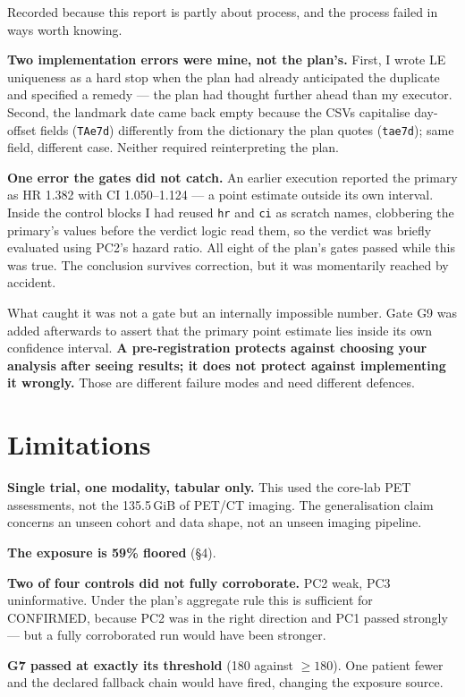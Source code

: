 \documentclass[11pt,a4paper]{article}
\begin{document}
Recorded because this report is partly about process, and the process failed in ways worth
knowing.

\textbf{Two implementation errors were mine, not the plan's.} First, I wrote LE uniqueness as a
hard stop when the plan had already anticipated the duplicate and specified a remedy --- the plan
had thought further ahead than my executor. Second, the landmark date came back empty because the
CSVs capitalise day-offset fields (\texttt{TAe7d}) differently from the dictionary the plan quotes
(\texttt{tae7d}); same field, different case. Neither required reinterpreting the plan.

\textbf{One error the gates did not catch.} An earlier execution reported the primary as
HR 1.382 with CI 1.050--1.124 --- a point estimate outside its own interval. Inside the control
blocks I had reused \texttt{hr} and \texttt{ci} as scratch names, clobbering the primary's values
before the verdict logic read them, so the verdict was briefly evaluated using PC2's hazard ratio.
All eight of the plan's gates passed while this was true. The conclusion survives correction, but
it was momentarily reached by accident.

What caught it was not a gate but an internally impossible number. Gate G9 was added afterwards to
assert that the primary point estimate lies inside its own confidence interval. \textbf{A
pre-registration protects against choosing your analysis after seeing results; it does not protect
against implementing it wrongly.} Those are different failure modes and need different defences.

\section{Limitations}

\textbf{Single trial, one modality, tabular only.} This used the core-lab PET assessments, not the
135.5\,GiB of PET/CT imaging. The generalisation claim concerns an unseen cohort and data shape,
not an unseen imaging pipeline.

\textbf{The exposure is 59\% floored} (\S4).

\textbf{Two of four controls did not fully corroborate.} PC2 weak, PC3 uninformative. Under the
plan's aggregate rule this is sufficient for CONFIRMED, because PC2 was in the right direction and
PC1 passed strongly --- but a fully corroborated run would have been stronger.

\textbf{G7 passed at exactly its threshold} (180 against $\geq 180$). One patient fewer and the
declared fallback chain would have fired, changing the exposure source.
\end{document}
